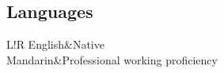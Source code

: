 \documentclass[10pt]{article}
\newcommand\VRule{\color{lightgray}\vrule width 0.5pt}
\begin{document}
\begin{CJK}{UTF8}{gbsn}
\vspace{-6pt}

\section*{Languages}
\begin{tabular}{L!{\VRule}R}
    English&Native\\
    Mandarin&Professional working proficiency\\
\end{tabular}

\end{CJK}
\end{document}
